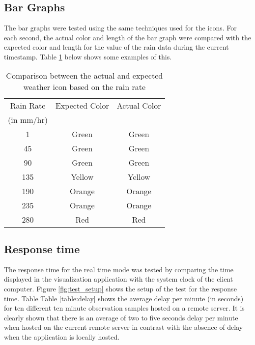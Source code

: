 \subsection{Bar Graphs}
The bar graphs were tested using the same techniques used for the icons. For each second, the actual color and length of the bar graph were compared with the expected color and length for the value of the rain data during the current timestamp. Table \ref{table:color_comparison} below shows some examples of this. 

\begin{table}
\caption{Comparison between the actual and expected weather icon based on the rain rate}
\centering
\begin{tabular}{c c c}%
\hline\hline
Rain Rate & Expected Color & Actual Color \\
(in mm/hr) & & \\ [0.5ex]
\hline
1	& Green &	Green \\
45 &	Green &	Green \\
90 & Green & Green \\
135 & Yellow & Yellow \\
190 & Orange & Orange \\
235 & Orange & Orange \\
280 & Red & Red \\ [1ex]
\hline
\end{tabular}
\label{table:color_comparison}
\end{table}
\bigskip

\subsection{Response time}
The response time for the real time mode was tested by comparing the time displayed in the visualization application with the system clock of the client computer. Figure \ref{fig:test_setup} shows the setup of the test for the response time. Table Table \ref{table:delay} shows the average delay per minute (in seconds) for ten different ten minute observation samples hosted on a remote server. It is clearly shown that there is an average of two to five seconds delay per minute when hosted on the current remote server in contrast with the absence of delay when the application is locally hosted.

